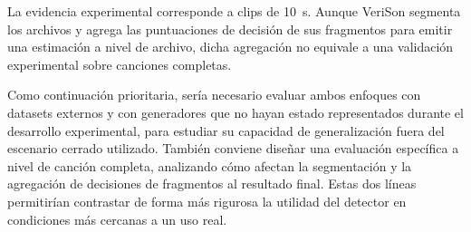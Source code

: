 La evidencia experimental corresponde a clips de 10~s. Aunque VeriSon segmenta los archivos y agrega las puntuaciones de decisión de sus fragmentos para emitir una estimación a nivel de archivo, dicha agregación no equivale a una validación experimental sobre canciones completas.

Como continuación prioritaria, sería necesario evaluar ambos enfoques con datasets externos y con generadores que no hayan estado representados durante el desarrollo experimental, para estudiar su capacidad de generalización fuera del escenario cerrado utilizado. También conviene diseñar una evaluación específica a nivel de canción completa, analizando cómo afectan la segmentación y la agregación de decisiones de fragmentos al resultado final. Estas dos líneas permitirían contrastar de forma más rigurosa la utilidad del detector en condiciones más cercanas a un uso real.

